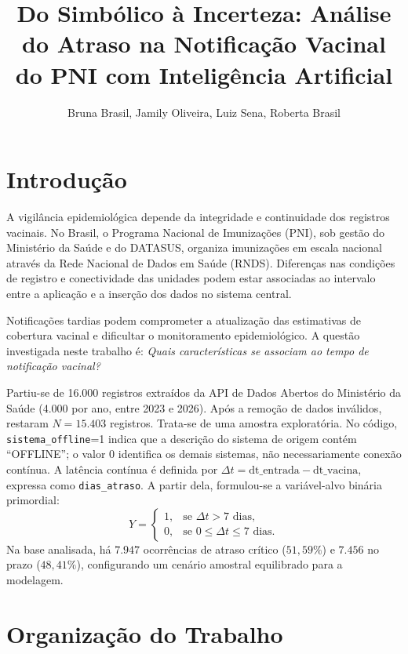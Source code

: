 \documentclass[12pt]{article}
\title{Do Simbólico à Incerteza: Análise do Atraso na Notificação Vacinal do PNI com Inteligência Artificial}
\author{Bruna Brasil\inst{1}, Jamily Oliveira\inst{1}, Luiz Sena\inst{1}, Roberta Brasil\inst{1}}
\begin{document}
\maketitle

\section{Introdução}

A vigilância epidemiológica depende da integridade e continuidade dos registros vacinais. No Brasil, o Programa Nacional de Imunizações (PNI), sob gestão do Ministério da Saúde e do DATASUS, organiza imunizações em escala nacional através da Rede Nacional de Dados em Saúde (RNDS). Diferenças nas condições de registro e conectividade das unidades podem estar associadas ao intervalo entre a aplicação e a inserção dos dados no sistema central.

Notificações tardias podem comprometer a atualização das estimativas de cobertura vacinal e dificultar o monitoramento epidemiológico. A questão investigada neste trabalho é: \textit{Quais características se associam ao tempo de notificação vacinal?}

Partiu-se de 16.000 registros extraídos da API de Dados Abertos do Ministério da Saúde (4.000 por ano, entre 2023 e 2026). Após a remoção de dados inválidos, restaram $N = 15.403$ registros. Trata-se de uma amostra exploratória. No código, \texttt{sistema\_offline}=1 indica que a descrição do sistema de origem contém ``OFFLINE''; o valor 0 identifica os demais sistemas, não necessariamente conexão contínua. A latência contínua é definida por $\Delta t = \text{dt\_entrada} - \text{dt\_vacina}$, expressa como \texttt{dias\_atraso}. A partir dela, formulou-se a variável-alvo binária primordial:
\begin{equation}
Y=\begin{cases}
1, & \text{se }\Delta t>7\text{ dias},\\
0, & \text{se }0\leq\Delta t\leq7\text{ dias}.
\end{cases}
\end{equation}
Na base analisada, há $7.947$ ocorrências de atraso crítico ($51,59\%$) e $7.456$ no prazo ($48,41\%$), configurando um cenário amostral equilibrado para a modelagem.

\section{Organização do Trabalho}
\end{document}
